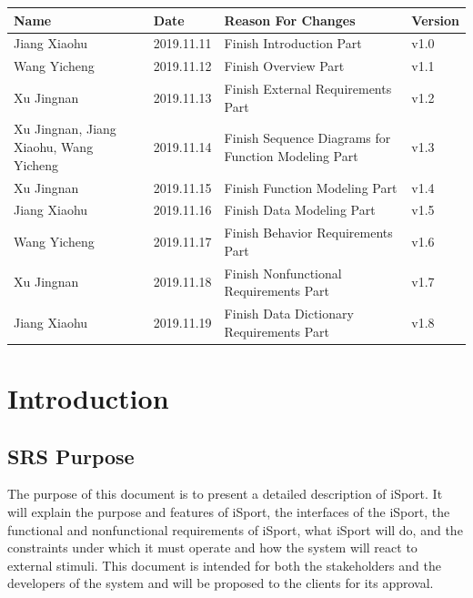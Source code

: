 \documentclass[16pt]{scrreprt}
\begin{document}
\begin{center}
    \begin{tabular}{|p{5cm}|p{3cm}|p{7cm}|p{2cm}|}
        \hline
	    Name & Date & Reason For Changes & Version\\
        \hline
	    Jiang Xiaohu & 2019.11.11 & Finish Introduction Part  & v1.0\\
        \hline
	    Wang Yicheng & 2019.11.12 & Finish Overview Part & v1.1\\
        \hline
        Xu Jingnan & 2019.11.13 & Finish External Requirements Part & v1.2\\
        \hline
        Xu Jingnan, Jiang Xiaohu, Wang Yicheng & 2019.11.14 & Finish Sequence Diagrams for Function Modeling Part& v1.3\\
        \hline
        Xu Jingnan & 2019.11.15 & Finish Function Modeling Part & v1.4\\
        \hline
        Jiang Xiaohu & 2019.11.16 & Finish Data Modeling Part  & v1.5\\
        \hline
        Wang Yicheng & 2019.11.17 & Finish Behavior Requirements Part & v1.6\\
        \hline
        Xu Jingnan & 2019.11.18 & Finish Nonfunctional Requirements Part & v1.7\\
        \hline
        Jiang Xiaohu & 2019.11.19 & Finish Data Dictionary Requirements Part & v1.8\\
        \hline
    \end{tabular}
\end{center}

\chapter{Introduction}

\section{SRS Purpose}
The purpose of this document is to present a detailed description of iSport. It will explain the purpose and features of iSport, the interfaces of the iSport, the functional and nonfunctional requirements of iSport, what iSport will do, and the constraints under which it must operate and how the system will react to external stimuli. This document is intended for both the stakeholders and the developers of the system and will be proposed to the clients for its approval.
\end{document}
